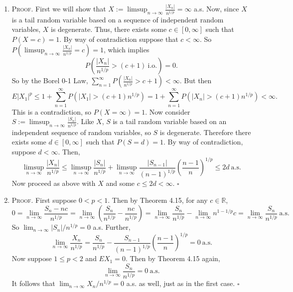 \documentclass[12pt]{article}
\newcounter{ProofCounter}
\newenvironment{Proof}{\stepcounter{ProofCounter}\textsc{Proof.}}{\hfill$\square$}
\begin{document}
\begin{enumerate}[label=(\alph*),topsep=3mm]
\item \begin{Proof}
First we will show that $X := \limsup_{n\rightarrow\infty}\frac{|X_{n}|}{n^{1/p}} = \infty$ a.s. Now, since $X$ is a tail random variable based on a
sequence of independent random variables, $X$ is degenerate. Thus, there exists some $c \in [0,\infty]$ such that $P(X = c) = 1$. By way of
contradiction suppose that $c < \infty$. So $P\left( \limsup_{n\rightarrow\infty}\frac{|X_{n}|}{n^{1/p}} = c \right) = 1$, which implies 
\[ P\left( \frac{|X_{n}|}{n^{1/p}} > (c+1)\ \text{i.o.} \right) = 0. \]
So by the Borel 0-1 Law, $\sum_{n=1}^{\infty}P\left( \frac{|X_{n}|}{n^{1/p}} > c + 1 \right) < \infty$. But then 
\[ E|X_{1}|^{p} \leq 1 + \sum_{n=1}^{\infty}P\left( |X_{1}| > (c+1)n^{1/p} \right) = 1 + \sum_{n=1}^{\infty}P\left( |X_{n}| > (c+1)n^{1/p} \right) <
\infty. \]
This is a contradiction, so $P(X = \infty) = 1$. Now consider $S := \limsup_{n\rightarrow\infty}\frac{|S_{n}|}{n^{1/p}}$. Like $X$, $S$ is a tail
random variable based on an independent sequence of random variables, so $S$ is degenerate. Therefore there exists some $d \in [0,\infty]$ such that
$P(S = d) = 1$. By way of contradiction, suppose $d < \infty$. Then,
\[ \limsup_{n\rightarrow\infty}\frac{|X_{n}|}{n^{1/p}} \leq \limsup_{n\rightarrow\infty}\frac{|S_{n}|}{n^{1/p}} +
\limsup_{n\rightarrow\infty}\frac{|S_{n-1}|}{(n-1)^{1/p}}\left(\frac{n-1}{n}\right)^{1/p} \leq 2d\ \text{a.s.} \]
Now proceed as above with $X$ and some $c \leq 2d < \infty$.
\end{Proof}

\item \begin{Proof}
First suppose $0 < p < 1$. Then by Theorem 4.15, for any $c \in \mathbb{R}$,
\[ 0 = \lim_{n\rightarrow\infty}\frac{S_{n} - nc}{n^{1/p}} =\lim_{n\rightarrow\infty} \left(\frac{S_{n}}{n^{1/p}} - \frac{nc}{n^{1/p}}\right) 
= \lim_{n\rightarrow\infty}\frac{S_{n}}{n^{1/p}} - \lim_{n\rightarrow\infty}n^{1 - 1/p}c = \lim_{n\rightarrow\infty}\frac{S_{n}}{n^{1/p}} \
\text{a.s.} \]
So $\lim_{n\rightarrow\infty}|S_{n}| / n^{1/p} = 0$ a.s. Further,
\[ \lim_{n\rightarrow\infty}\frac{X_{n}}{n^{1/p}} = \frac{S_{n}}{n^{1/p}} - \frac{S_{n-1}}{(n-1)^{1/p}}\left( \frac{n-1}{n} \right)^{1/p} = 0\ \text{
a.s.} \]
Now suppose $1 \leq p < 2$ and $EX_{1} = 0$. Then by Theorem 4.15 again,
\[ \lim_{n\rightarrow\infty}\frac{S_{n}}{n^{1/p}} = 0 \ \text{a.s.} \]
It follows that $\lim_{n\rightarrow\infty}X_{n}/n^{1/p} = 0$ a.s. as well, just as in the first case.
\end{Proof}
\end{enumerate}
\end{document}
